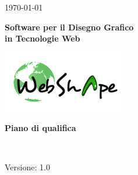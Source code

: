
\title{\TITOLODOC}
\author{Dissegna Stefano}



\renewcommand{\insertversion}{1.0} %
\renewcommand{\TITOLODOC}{Piano di qualifica} %
\renewcommand{\glosspath}{.\glossario} %

\begin{titlepage}
\begin{center}
	\begin{Large}	\today \end{Large}
\end{center}

\vspace{20pt}

\begin{center}
	\begin{Huge}
				\textbf{\ajax}
	\end{Huge}
\end{center}			

\begin{center}
	\begin{large}
				\textbf{Software per il Disegno Grafico\\ in Tecnologie Web}
	\end{large}
\end{center}			

\vspace{20pt}

\begin{center}
\includegraphics[width=150pt]{../logo/logo}
\end{center}

\vspace{170pt}
\begin{center} %
	\begin{Huge}
				\textbf{\TITOLODOC}
	\end{Huge}
			\\
\end{center}
\vspace{210pt}
\begin{center}
Versione: \insertversion
\end{center}
\end{titlepage}


